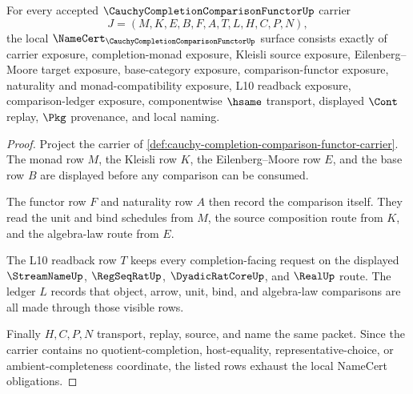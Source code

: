 \begin{theorem}
\label{thm:cauchy-completion-comparison-functor-namecert-obligations}
For every accepted $\CauchyCompletionComparisonFunctorUp$ carrier
$$
J=(M,K,E,B,F,A,T,L,H,C,P,N),
$$
the local $\NameCert_{\CauchyCompletionComparisonFunctorUp}$ surface consists exactly of carrier exposure, completion-monad exposure, Kleisli source exposure, Eilenberg--Moore target exposure, base-category exposure, comparison-functor exposure, naturality and monad-compatibility exposure, L10 readback exposure, comparison-ledger exposure, componentwise $\hsame$ transport, displayed $\Cont$ replay, $\Pkg$ provenance, and local naming.
\end{theorem}
\begin{proof}
Project the carrier of \autoref{def:cauchy-completion-comparison-functor-carrier}. The monad row $M$, the Kleisli row $K$, the Eilenberg--Moore row $E$, and the base row $B$ are displayed before any comparison can be consumed.

The functor row $F$ and naturality row $A$ then record the comparison itself. They read the unit and bind schedules from $M$, the source composition route from $K$, and the algebra-law route from $E$.

The L10 readback row $T$ keeps every completion-facing request on the displayed $\StreamNameUp$, $\RegSeqRatUp$, $\DyadicRatCoreUp$, and $\RealUp$ route. The ledger $L$ records that object, arrow, unit, bind, and algebra-law comparisons are all made through those visible rows.

Finally $H,C,P,N$ transport, replay, source, and name the same packet. Since the carrier contains no quotient-completion, host-equality, representative-choice, or ambient-completeness coordinate, the listed rows exhaust the local NameCert obligations.
\end{proof}

